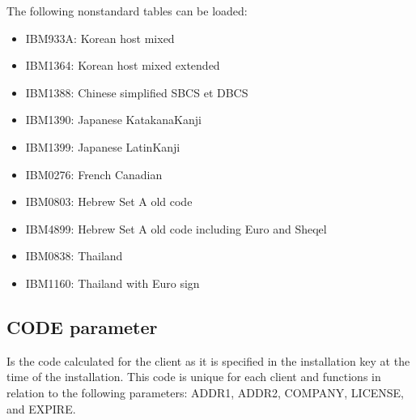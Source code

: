 \documentclass[letterpaper,10pt,english]{sphinxmanual}
\begin{document}
\sphinxAtStartPar
The following non\sphinxhyphen{}standard tables can be loaded:
\begin{itemize}
\item {} 
\sphinxAtStartPar
IBM933A: Korean host mixed

\item {} 
\sphinxAtStartPar
IBM1364: Korean host mixed extended

\item {} 
\sphinxAtStartPar
IBM1388: Chinese simplified SBCS et DBCS

\item {} 
\sphinxAtStartPar
IBM1390: Japanese Katakana\sphinxhyphen{}Kanji

\item {} 
\sphinxAtStartPar
IBM1399: Japanese Latin\sphinxhyphen{}Kanji

\item {} 
\sphinxAtStartPar
IBM0276: French Canadian

\item {} 
\sphinxAtStartPar
IBM0803: Hebrew Set A old code

\item {} 
\sphinxAtStartPar
IBM4899: Hebrew Set A old code including Euro and Sheqel

\item {} 
\sphinxAtStartPar
IBM0838: Thailand

\item {} 
\sphinxAtStartPar
IBM1160: Thailand with Euro sign

\end{itemize}

\ignorespaces 

\subsection{CODE parameter}
\label{\detokenize{Installation_Guide:code-parameter}}\label{\detokenize{Installation_Guide:index-44}}
\begin{sphinxVerbatim}[commandchars=\\\{\}]
 
\end{sphinxVerbatim}

\sphinxAtStartPar
{} \sphinxhyphen{} Is the code calculated for the client as it is specified in the installation key at the time of the installation. This code
is unique for each client and functions in relation to the following parameters: ADDR1, ADDR2, COMPANY, LICENSE, and EXPIRE.
\end{document}
